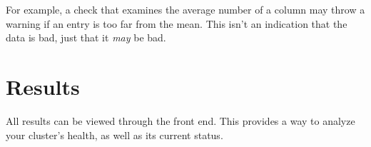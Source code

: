     For example, a check that examines the average number of a column may throw a warning if an entry is too far from the
    mean. This isn't an indication that the data is bad, just that it \textit{may} be bad.

\section{Results}
All results can be viewed through the front end. This provides a way to analyze your cluster's health, as well as its
current status.

